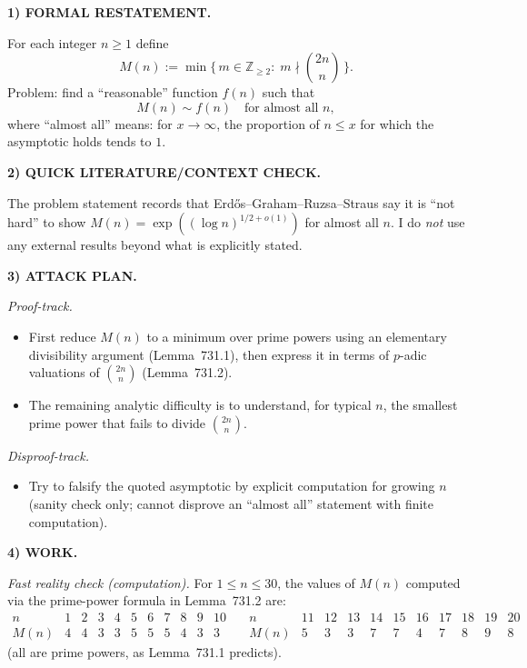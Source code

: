 \noindent\textbf{1) FORMAL RESTATEMENT.}

For each integer $n\ge 1$ define
\[
M(n):=\min\{\,m\in\mathbb Z_{\ge 2}:\; m\nmid \binom{2n}{n}\,\}.
\]
Problem: find a ``reasonable'' function $f(n)$ such that
\[
M(n)\sim f(n)\quad\text{for almost all }n,
\]
where ``almost all'' means: for $x\to\infty$, the proportion of $n\le x$ for which the asymptotic holds tends to $1$.

\medskip
\noindent\textbf{2) QUICK LITERATURE/CONTEXT CHECK.}

The problem statement records that Erd\H{o}s--Graham--Ruzsa--Straus say it is ``not hard'' to show
$M(n)=\exp((\log n)^{1/2+o(1)})$ for almost all $n$. I do \emph{not} use any external results beyond what is explicitly stated.

\medskip
\noindent\textbf{3) ATTACK PLAN.}

\emph{Proof-track.}
\begin{itemize}
\item First reduce $M(n)$ to a minimum over prime powers using an elementary divisibility argument (Lemma~731.1), then express it in terms of $p$-adic valuations of $\binom{2n}{n}$ (Lemma~731.2).
\item The remaining analytic difficulty is to understand, for typical $n$, the smallest prime power that fails to divide $\binom{2n}{n}$.
\end{itemize}
\emph{Disproof-track.}
\begin{itemize}
\item Try to falsify the quoted asymptotic by explicit computation for growing $n$ (sanity check only; cannot disprove an ``almost all'' statement with finite computation).
\end{itemize}

\medskip
\noindent\textbf{4) WORK.}

\noindent\emph{Fast reality check (computation).}
For $1\le n\le 30$, the values of $M(n)$ computed via the prime-power formula in Lemma~731.2 are:
\[
\begin{array}{c|cccccccccc}
 n&1&2&3&4&5&6&7&8&9&10\\\hline
 M(n)&4&4&3&3&5&5&5&4&3&3
\end{array}
\quad
\begin{array}{c|cccccccccc}
 n&11&12&13&14&15&16&17&18&19&20\\\hline
 M(n)&5&3&3&7&7&4&7&8&9&8
\end{array}
\]
(all are prime powers, as Lemma~731.1 predicts).

